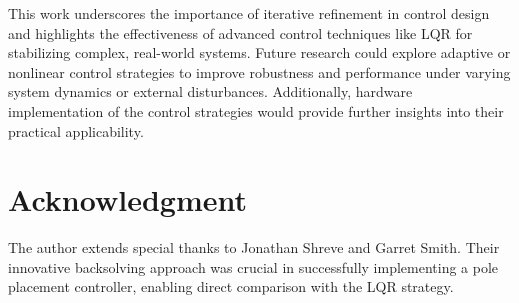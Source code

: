 \documentclass[conference]{IEEEtran}
\begin{document}
This work underscores the importance of iterative refinement in control design and highlights the effectiveness of advanced control techniques like LQR for stabilizing complex, real-world systems. Future research could explore adaptive or nonlinear control strategies to improve robustness and performance under varying system dynamics or external disturbances. Additionally, hardware implementation of the control strategies would provide further insights into their practical applicability.

\section*{Acknowledgment}
The author extends special thanks to Jonathan Shreve and Garret Smith. Their innovative backsolving approach was crucial in successfully implementing a pole placement controller, enabling direct comparison with the LQR strategy.



\end{document}
